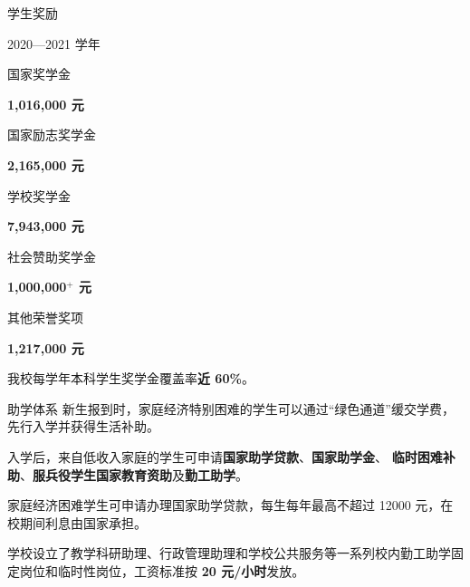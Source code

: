 \documentclass[aspectratio=169, utf8]{beamer}
\begin{document}
\begin{frame}{学生奖励}
    \begin{block}{2020—2021 学年}
        \begin{multicols}{3}
            \begin{center}
                国家奖学金

                \textcolor{Fore}{\textbf{\Large{1,016,000 元}}}\\[1em]
            \end{center}

            \begin{center}
                国家励志奖学金

                \textcolor{Fore}{\textbf{\Large{2,165,000 元}}}\\[1em]
            \end{center}

            \begin{center}
                学校奖学金

                \textcolor{Fore}{\textbf{\Large{7,943,000 元}}}\\[1em]
            \end{center}

            \begin{center}
                社会赞助奖学金

                \textcolor{Fore}{\textbf{\Large{1,000,000$^+$ 元}}}\\[1em]
            \end{center}

            \begin{center}
                其他荣誉奖项

                \textcolor{Fore}{\textbf{\Large{1,217,000 元}}}\\[1em]
            \end{center}
        \end{multicols}
    \end{block}

    我校每学年本科学生奖学金覆盖率\textcolor{Fore}{\textbf{近 60\%}}。
\end{frame}

\begin{frame}{助学体系}
    新生报到时，家庭经济特别困难的学生可以通过“绿色通道”缓交学费，先行入学并获得生活补助。

    入学后，来自低收入家庭的学生可申请\textcolor{Fore}{\textbf{国家助学贷款}}、\textcolor{Fore}{\textbf{国家助学金}}、
    \textcolor{Fore}{\textbf{临时困难补助}}、\textcolor{Fore}{\textbf{服兵役学生国家教育资助}}及\textcolor{Fore}{\textbf{勤工助学}}。

    家庭经济困难学生可申请办理国家助学贷款，每生每年最高不超过 12000 元，在校期间利息由国家承担。

    学校设立了教学科研助理、行政管理助理和学校公共服务等一系列校内勤工助学固定岗位和临时性岗位，工资标准按 \textcolor{Fore}{\textbf{20 元/小时}}发放。
\end{frame}
\end{document}

